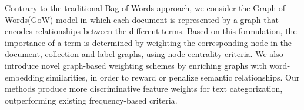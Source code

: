 Contrary to the traditional Bag-of-Words approach, we consider the Graph-of-Words(GoW) model in which each document is represented by a graph that encodes relationships between the different terms. Based on this formulation, the importance of a term is determined by weighting the corresponding node in the document, collection and label graphs, using node centrality criteria. We also introduce novel graph-based weighting schemes by enriching graphs with word-embedding similarities, in order to reward or penalize semantic relationships. Our methods produce more discriminative feature weights for text categorization, outperforming existing frequency-based criteria.
